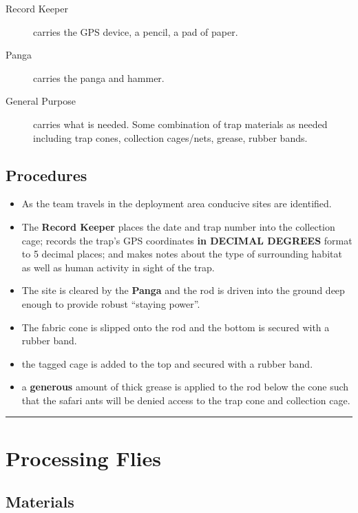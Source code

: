 \documentclass[letterpaper]{scrreprt}
\begin{document}
\begin{description}
\item[Record Keeper]
carries the GPS device, a pencil, a pad of paper.
\item[Panga]
carries the panga and hammer.
\item[General Purpose]
carries what is needed. Some combination of trap materials as needed
including trap cones, collection cages/nets, grease, rubber bands.
\end{description}

\section{Procedures}\label{procedures}

\begin{itemize}
\itemsep1pt\parskip0pt
\item
  As the team travels in the deployment area conducive sites are
  identified.
\item
  The \textbf{Record Keeper} places the date and trap number into the
  collection cage; records the trap's GPS coordinates \textbf{in DECIMAL
  DEGREES} format to 5 decimal places; and makes notes about the type of
  surrounding habitat as well as human activity in sight of the trap.
\item
  The site is cleared by the \textbf{Panga} and the rod is driven into
  the ground deep enough to provide robust ``staying power''.
\item
  The fabric cone is slipped onto the rod and the bottom is secured with
  a rubber band.
\item
  the tagged cage is added to the top and secured with a rubber band.
\item
  a \textbf{generous} amount of thick grease is applied to the rod below
  the cone such that the safari ants will be denied access to the trap
  cone and collection cage.
\end{itemize}

\begin{center}\rule{0.5\linewidth}{\linethickness}\end{center}

\chapter{Processing Flies}\label{processing-flies}

\section{Materials}\label{materials-1}
\end{document}
